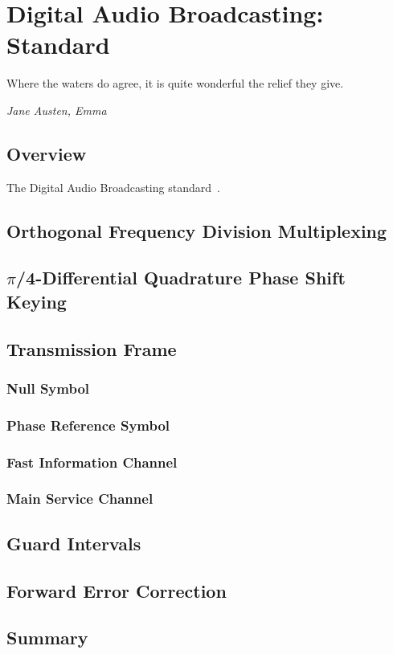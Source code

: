\documentclass[class=report,11pt,crop=false]{standalone}
\begin{document}
\chapter{Digital Audio Broadcasting: Standard}
\epigraph{Where the waters do agree, it is quite wonderful the relief they give.}%
{\emph{Jane Austen, Emma}}

\section{Overview}
The Digital Audio Broadcasting standard~\cite{dabstandard}.

\blindtext

\section{Orthogonal Frequency Division Multiplexing}
\blindtext

\section{\texorpdfstring{$\pi$}//4-Differential Quadrature Phase Shift Keying}
\blindtext

\section{Transmission Frame}
\blindtext

\subsection{Null Symbol}
\blindtext

\subsection{Phase Reference Symbol}
\blindtext

\subsection{Fast Information Channel}
\blindtext

\subsection{Main Service Channel}
\blindtext

\section{Guard Intervals}
\blindtext

\section{Forward Error Correction}
\blindtext

\section{Summary}
\blindtext

\ifstandalone

\printnoidxglossary[type=\acronymtype,nonumberlist]
\fi
\end{document}
